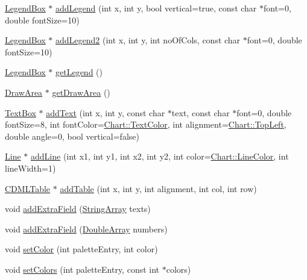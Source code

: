 \begin{DoxyCompactItemize}
\item 
\hyperlink{class_legend_box}{Legend\+Box} $\ast$ \hyperlink{class_base_chart_ad204c676b75a5e1527dcd01066c1aab4}{add\+Legend} (int x, int y, bool vertical=true, const char $\ast$font=0, double font\+Size=10)
\item 
\hyperlink{class_legend_box}{Legend\+Box} $\ast$ \hyperlink{class_base_chart_a2f48c68e5336176aae4922db13b12f9b}{add\+Legend2} (int x, int y, int no\+Of\+Cols, const char $\ast$font=0, double font\+Size=10)
\item 
\hyperlink{class_legend_box}{Legend\+Box} $\ast$ \hyperlink{class_base_chart_a4e8b4c7a977c3000de134fa58b261a93}{get\+Legend} ()
\item 
\hyperlink{class_draw_area}{Draw\+Area} $\ast$ \hyperlink{class_base_chart_aa9314241244d1361b8cf0bac3e2242dd}{get\+Draw\+Area} ()
\item 
\hyperlink{class_text_box}{Text\+Box} $\ast$ \hyperlink{class_base_chart_a2a2016142a7036736cc0c3ffd43a5d80}{add\+Text} (int x, int y, const char $\ast$text, const char $\ast$font=0, double font\+Size=8, int font\+Color=\hyperlink{namespace_chart_abee0d882fdc9ad0b001245ad9fc64011a879e14f2f5024caccc047374342321ef}{Chart\+::\+Text\+Color}, int alignment=\hyperlink{namespace_chart_ae222e51ce11a254450b6ddfbc862680aa0bf92d1d2d6713aa62e92b86b9a8532f}{Chart\+::\+Top\+Left}, double angle=0, bool vertical=false)
\item 
\hyperlink{class_line}{Line} $\ast$ \hyperlink{class_base_chart_aef7dd1cbac801d351327e917de4130c7}{add\+Line} (int x1, int y1, int x2, int y2, int color=\hyperlink{namespace_chart_abee0d882fdc9ad0b001245ad9fc64011a04817a359476e87a5c572a7a69cdaaec}{Chart\+::\+Line\+Color}, int line\+Width=1)
\item 
\hyperlink{class_c_d_m_l_table}{C\+D\+M\+L\+Table} $\ast$ \hyperlink{class_base_chart_ac54ec67149fa1573b524aa2d9efc11ff}{add\+Table} (int x, int y, int alignment, int col, int row)
\item 
void \hyperlink{class_base_chart_a186739200492658bd4e1d73d025ffdf1}{add\+Extra\+Field} (\hyperlink{class_string_array}{String\+Array} texts)
\item 
void \hyperlink{class_base_chart_a485ce8c856c9d27abf934103ad5db4ee}{add\+Extra\+Field} (\hyperlink{class_double_array}{Double\+Array} numbers)
\item 
void \hyperlink{class_base_chart_a8ec5ca1cea984df560c860edb0a04121}{set\+Color} (int palette\+Entry, int color)
\item 
void \hyperlink{class_base_chart_adc8642282f64647f8adf3730b4ee84a3}{set\+Colors} (int palette\+Entry, const int $\ast$colors)

\end{DoxyCompactItemize}

